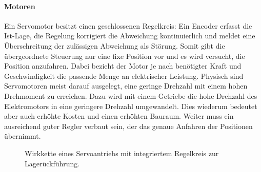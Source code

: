 \paragraph{Motoren}
Ein Servomotor besitzt einen geschlossenen Regelkreis: Ein Encoder erfasst die Ist-Lage, die Regelung korrigiert die Abweichung
kontinuierlich und meldet eine Überschreitung der zulässigen Abweichung als Störung.
Somit gibt die übergeordnete Steuerung nur eine fixe Position vor und es wird versucht, die Position anzufahren. Dabei bezieht der
Motor je nach benötigter Kraft und Geschwindigkeit die passende Menge an elektrischer Leistung. Physisch sind Servomotoren meist
darauf ausgelegt, eine geringe Drehzahl mit einem hohen Drehmoment zu erreichen. Dazu wird mit einem Getriebe die hohe Drehzahl
des Elektromotors in eine geringere Drehzahl umgewandelt. Dies wiederum bedeutet aber auch erhöhte Kosten und einen erhöhten Bauraum.
Weiter muss ein ausreichend guter Regler verbaut sein, der das genaue Anfahren der Positionen übernimmt.

\begin{figure}[htbp]
  \centering
  \caption[Wirkkette eines Servoantriebs]%
          {Wirkkette eines Servoantriebs mit integriertem Regelkreis zur Lagerückführung.}
  \label{fig:wirkkette-antrieb}
\end{figure}

